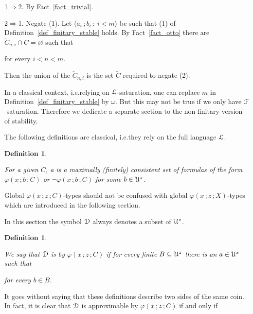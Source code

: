 \documentclass{amsproc}
\makeatletter
\newcounter{thm}
\theoremstyle{mio}
\newtheorem{definition}[thm]{Definition}\tcolorboxenvironment{definition}{mythm}
\providecommand{\proofNameStyle}{\bfseries}
\renewenvironment{proof}[1][\proofname]{\par
  \pushQED{\qed}%
  \normalfont%
  \trivlist
  \item[\hskip\labelsep
        \proofNameStyle
    #1\@addpunct{.}]\ignorespaces
}{%
  \popQED\endtrivlist\@endpefalse
}
\renewcommand*{\emph}[1]{%
   \smash{\tikz[baseline]\node[rectangle, fill=teal!25, rounded corners, inner xsep=0.5ex, inner ysep=0.2ex, anchor=base, minimum height = 2.7ex]{\strut #1};}}
\makeatother
\begin{document}
\begin{proof}
  1$\Rightarrow$2.
  By Fact~\ref{fact_trivial}.

  2$\Rightarrow$1.
  Negate (1).
  Let $\langle a_i\,;b_i\ :\ i<m\rangle$ be such that (1) of Definition~\ref{def_finitary_stable} holds.
  By Fact~\ref{fact_otto} there are $\tilde C_{n,i}\cap C=\varnothing$ such that 

  \hfill for every $i<n<m$.

  Then the union of the $\tilde C_{n,i}$ is the set $\tilde C$ required to negate (2).
\end{proof}

In a classical context, i.e.\@ relying on ${\EuScript L}$-saturation, one can replace $m$ in Definition~\ref{def_finitary_stable} by $\omega$.
But this may not be true if we only have ${\EuScript F}$-saturation.
Therefore we dedicate a separate section to the non-finitary version of stability.

The following definitions are classical, i.e.\@ they rely on the full language ${\EuScript L}$.

\begin{definition}\label{def_globaltype}\strut
  For a given $C$, a \emph{global $\varphi(x\,;z\,;C)$-type\/} is a maximally (finitely) consistent set of formulas of the form $\varphi(x\,;b\,;C)$ or $\neg\varphi(x\,;b\,;C)$ for some $b\in{\EuScript U}^{z}$.
\end{definition}

Global $\varphi(x\,;z\,;C)$-types should not be confused with global $\varphi(x\,;z\,;X)$-types which are introduced in the following section.

In this section the symbol ${\EuScript D}$ always denotes a subset of ${\EuScript U}^z$.

\begin{definition}\label{def_approx}\strut
  We say that ${\EuScript D}$ is \emph{approximable\/} by $\varphi(x\,;z\,;C)$ if for every finite $B\subseteq {\EuScript U}^z$ there is an $a\in {\EuScript U}^x$ such that\smallskip

  \hfill for every $b\in B$.
\end{definition}

It goes without saying that these definitions describe two sides of the same coin.
In fact, it is clear that ${\EuScript D}$ is approximable by $\varphi(x\,;z\,;C)$ if and only if  
    
\end{document}
